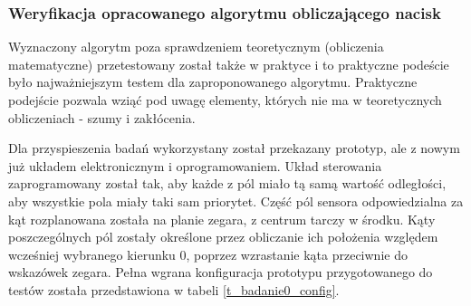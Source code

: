 \subsubsection{Weryfikacja opracowanego algorytmu obliczającego nacisk}
\label{sss_budowa_weryfikacja_algorytmu}

Wyznaczony algorytm poza sprawdzeniem teoretycznym (obliczenia matematyczne) przetestowany został także w praktyce i to praktyczne podeście było najważniejszym testem dla zaproponowanego algorytmu. Praktyczne podejście pozwala wziąć pod uwagę elementy, których nie ma w teoretycznych obliczeniach - szumy i zakłócenia. 

Dla przyspieszenia badań wykorzystany został przekazany prototyp, ale z nowym już układem elektronicznym i oprogramowaniem. Układ sterowania zaprogramowany został tak, aby każde z pól miało tą samą wartość odległości, aby wszystkie pola miały taki sam priorytet. Część pól sensora odpowiedzialna za kąt rozplanowana została na planie zegara, z centrum tarczy w środku. Kąty poszczególnych pól zostały określone przez obliczanie ich położenia względem wcześniej wybranego kierunku 0, poprzez wzrastanie kąta przeciwnie do wskazówek zegara.
Pełna wgrana konfiguracja prototypu przygotowanego do testów została przedstawiona w tabeli \ref{t_badanie0_config}.

